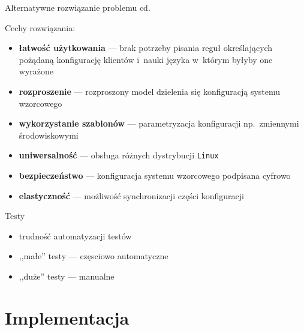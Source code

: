 \documentclass[notes,polish,xcolor=dvipsnames,aspectratio=169]{beamer}
\begin{document}
\begin{frame}{Alternatywne rozwiązanie problemu cd.}

Cechy rozwiązania:
\begin{itemize}
	\item \textbf{łatwość użytkowania} --- brak potrzeby pisania reguł określających pożądaną konfigurację klientów i~nauki języka w~którym byłyby one wyrażone
	\item \textbf{rozproszenie} --- rozproszony model dzielenia się konfiguracją systemu wzorcowego
	\item \textbf{wykorzystanie szablonów} --- parametryzacja konfiguracji np.~zmiennymi środowiskowymi
	\item \textbf{uniwersalność} --- obsługa różnych dystrybucji \texttt{Linux}
	\item \textbf{bezpieczeństwo} --- konfiguracja systemu wzorcowego podpisana cyfrowo
	\item \textbf{elastyczność} --- możliwość synchronizacji części konfiguracji
\end{itemize}

\end{frame}


\begin{frame}{Testy}

\begin{itemize}
	\item trudność automatyzacji testów
	\item ,,małe'' testy --- częsciowo automatyczne
	\item ,,duże'' testy --- manualne
\end{itemize}

\end{frame}




\section{Implementacja}
\end{document}
